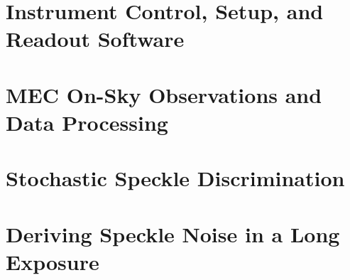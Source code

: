 \documentclass[oneside,12pt,final]{sty/ucthesis-CA2012}
\begin{document}
\begin{mainmatter}
\chapter{Instrument Control, Setup, and Readout Software}



\chapter{MEC On-Sky Observations and Data Processing}


\chapter{Stochastic Speckle Discrimination}





\appendix
\dsp
\chapter{Deriving Speckle Noise in a Long Exposure}{\label{appendix:a}}





\end{mainmatter}

\ssp
%
\printbibliography
\end{document}
